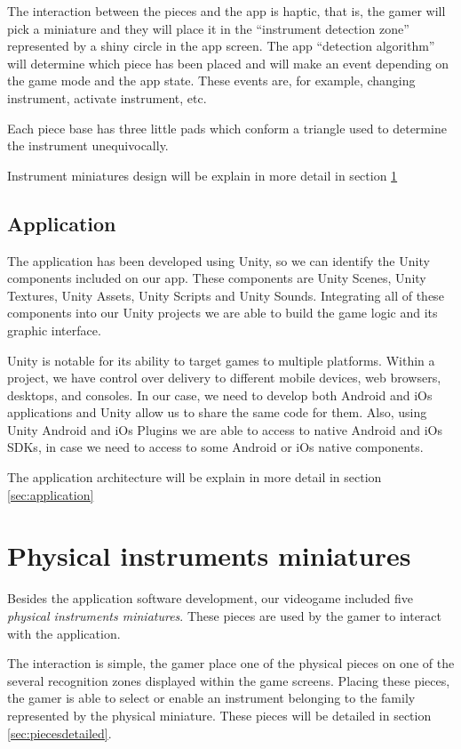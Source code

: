 The interaction between the pieces and the app is haptic, that is, the gamer will pick a miniature and they will place it in the “instrument detection zone” represented by a shiny circle in the app screen. The app “detection algorithm” will determine which piece has been placed and will make an event depending on the game mode and the app state. These events are, for example, changing instrument, activate instrument, etc.

Each piece base has three little pads which conform a triangle used to determine the instrument unequivocally.

Instrument miniatures design will be explain in more detail in section \ref{sec:instrumentminuatures}

\subsection{Application}
The application has been developed using Unity, so we can identify the Unity components included on our app. These components are Unity Scenes, Unity Textures, Unity Assets, Unity Scripts and Unity Sounds. Integrating all of these components into our Unity projects we are able to build the game logic and its graphic interface.

Unity is notable for its ability to target games to multiple platforms. Within a project, we have control over delivery to different mobile devices, web browsers, desktops, and consoles. In our case, we need to develop both Android and iOs applications and Unity allow us to share the same code for them. Also, using Unity Android and iOs Plugins we are able to access to native Android and iOs SDKs, in case we need to access to some Android or iOs native components.

The application architecture will be explain in more detail in section \ref{sec:application}

\FloatBarrier

\section{Physical instruments miniatures}
\label{sec:instrumentminuatures}
Besides the application software development, our videogame included five \textit{physical instruments miniatures}. These pieces are used by the gamer to interact with the application.

The interaction is simple, the gamer place one of the physical pieces on one of the several recognition zones displayed within the game screens. Placing these pieces, the gamer is able to select or enable an instrument belonging to the family represented by the physical miniature. These pieces will be detailed in section \ref{sec:piecesdetailed}.

